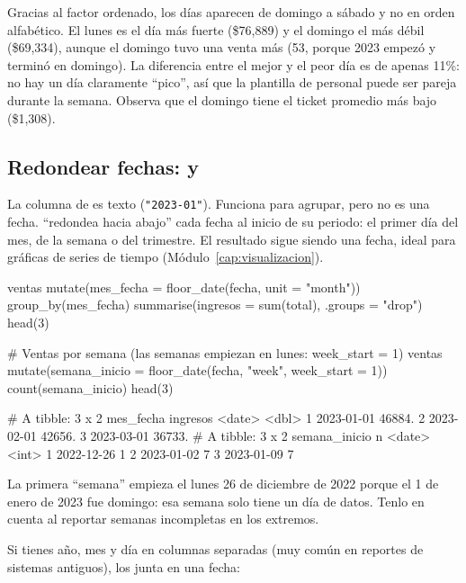 Gracias al factor ordenado, los días aparecen de domingo a sábado y no en
orden alfabético. El lunes es el día más fuerte (\$76,889) y el domingo el
más débil (\$69,334), aunque el domingo tuvo una venta más (53, porque 2023
empezó y terminó en domingo). La diferencia entre el mejor y el peor día es
de apenas 11\%: no hay un día claramente ``pico'', así que la plantilla de
personal puede ser pareja durante la semana. Observa que el domingo tiene
el ticket promedio más bajo (\$1,308).

\subsection{Redondear fechas: \texorpdfstring{}{floor\_date()} y \texorpdfstring{}{make\_date()}}

La columna  de  es texto (\texttt{"2023-01"}).
Funciona para agrupar, pero no es una fecha. 
``redondea hacia abajo'' cada fecha al inicio de su periodo: el primer día
del mes, de la semana o del trimestre. El resultado sigue siendo una fecha,
ideal para gráficas de series de tiempo (Módulo~\ref{cap:visualizacion}).

\begin{rcode}
ventas %
  mutate(mes_fecha = floor_date(fecha, unit = "month")) %
  group_by(mes_fecha) %
  summarise(ingresos = sum(total), .groups = "drop") %
  head(3)

# Ventas por semana (las semanas empiezan en lunes: week_start = 1)
ventas %
  mutate(semana_inicio = floor_date(fecha, "week", week_start = 1)) %
  count(semana_inicio) %
  head(3)
\end{rcode}
\begin{rsalida}
# A tibble: 3 x 2
  mes_fecha  ingresos
  <date>        <dbl>
1 2023-01-01   46884.
2 2023-02-01   42656.
3 2023-03-01   36733.
# A tibble: 3 x 2
  semana_inicio     n
  <date>        <int>
1 2022-12-26        1
2 2023-01-02        7
3 2023-01-09        7
\end{rsalida}

La primera ``semana'' empieza el lunes 26 de diciembre de 2022 porque el 1
de enero de 2023 fue domingo: esa semana solo tiene un día de datos. Tenlo
en cuenta al reportar semanas incompletas en los extremos.

Si tienes año, mes y día en columnas separadas (muy común en reportes de
sistemas antiguos),  los junta en una fecha:

